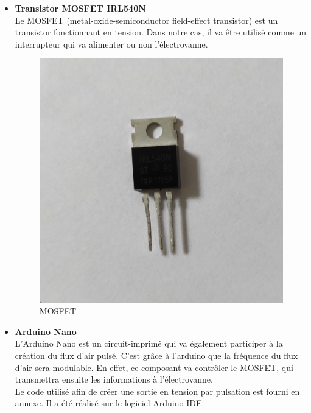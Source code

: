 \begin{itemize}
    \item \textbf{Transistor MOSFET IRL540N}\\
          Le MOSFET (metal-oxide-semiconductor field-effect transistor) est un transistor fonctionnant en tension. Dans notre cas, il va
          être utilisé comme un interrupteur qui va alimenter ou non l'électrovanne.
          \begin{figure}[H]
              \centering
              \includegraphics[scale = 0.05]{assets/figures/mosfet_visuel.jpg}
              \caption{MOSFET}
              \label{fig:mosfet}
          \end{figure}
          
    \item \textbf{Arduino Nano}\\
          L'Arduino Nano est un circuit-imprimé qui va également participer à la création du flux d'air pulsé. C'est grâce à l'arduino que la
          fréquence du flux d'air sera modulable. En effet, ce composant va contrôler le MOSFET, qui transmettra ensuite les informations à
          l'électrovanne.\\
          Le code utilisé afin de créer une sortie en tension par pulsation est fourni en annexe. Il a été réalisé sur le logiciel Arduino IDE.\\
          
\end{itemize}

